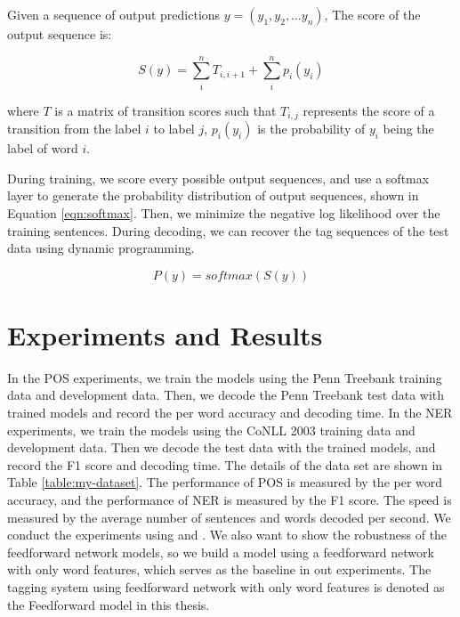 Given a sequence of output predictions $y=\left( y_{1},y_{2},\ldots y_{n}\right)$,
The score of the output sequence is:

\begin{equation}
S\left( y\right)=\sum _{i}^{n}T_{i,i+1}+\sum _{i}^{n}p_{i}\left(y_{i}\right)
\end{equation}

where $T$ is a matrix of transition scores such that $T_{i,j}$ represents the score of a transition from the label $i$ to label $j$, $p_{i}\left(y_{i}\right)$ is the probability of $y_{i}$ being the label of word $i$.

During training, we score every possible output sequences, and use a softmax layer to generate the probability distribution of output sequences, shown in Equation \ref{eqn:softmax}. Then, we minimize the negative log likelihood over the training sentences. During decoding, we can recover the tag sequences of the test data using dynamic programming.

\begin{equation}\label{eqn:softmax}
P\left( y\right) = \textit{softmax}(S\left( y\right))
\end{equation}


\section{Experiments and Results}

In the POS experiments, we train the models using the Penn Treebank training data and development data. Then, we decode the Penn Treebank test data with trained models and record the per word accuracy and decoding time. In the NER experiments, we train the models using the CoNLL 2003 training data and development data. Then we decode the test data with the trained models, and record the F1 score and decoding time. The details of the data set are shown in Table \ref{table:my-dataset}. The performance of POS is measured by the per word accuracy, and the performance of NER is measured by the F1 score. The speed is measured by the average number of sentences and words decoded per second. We conduct the experiments using \ffa{} and \ffb. We also want to show the robustness of the feedforward network models, so we build a model using a feedforward network with only word features, which serves as the baseline in out experiments. The tagging system using feedforward network with only word features is denoted as the Feedforward model in this thesis.

